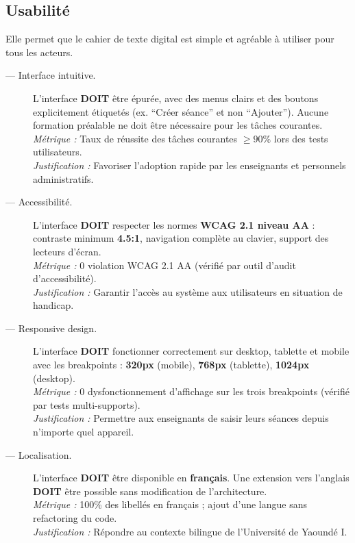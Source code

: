 \subsection{Usabilité}

Elle permet  que le cahier de texte digital est simple et agréable
à utiliser pour tous les acteurs.

\begin{description}

    \item[ — Interface intuitive.]
    L'interface \textbf{DOIT} être épurée, avec des menus clairs et des
    boutons explicitement étiquetés (ex. ``Créer séance'' et non
    ``Ajouter''). Aucune formation préalable ne doit être nécessaire
    pour les tâches courantes.\\
    \textit{Métrique :} Taux de réussite des tâches courantes $\geq 90\%$
    lors des tests utilisateurs.\\
    \textit{Justification :} Favoriser l'adoption rapide par les enseignants
    et personnels administratifs.

    \item[ — Accessibilité.]
    L'interface \textbf{DOIT} respecter les normes \textbf{WCAG 2.1 niveau AA} :
    contraste minimum \textbf{4.5:1}, navigation complète au clavier,
    support des lecteurs d'écran.\\
    \textit{Métrique :} 0 violation WCAG 2.1 AA
    (vérifié par outil d'audit d'accessibilité).\\
    \textit{Justification :} Garantir l'accès au système aux utilisateurs
    en situation de handicap.

    \item[ — Responsive design.]
    L'interface \textbf{DOIT} fonctionner correctement sur desktop, tablette
    et mobile avec les breakpoints : \textbf{320px} (mobile),
    \textbf{768px} (tablette), \textbf{1024px} (desktop).\\
    \textit{Métrique :} 0 dysfonctionnement d'affichage sur les trois
    breakpoints (vérifié par tests multi-supports).\\
    \textit{Justification :} Permettre aux enseignants de saisir leurs
    séances depuis n'importe quel appareil.

    \item[ — Localisation.]
    L'interface \textbf{DOIT} être disponible en \textbf{français}.
    Une extension vers l'anglais \textbf{DOIT} être possible sans
    modification de l'architecture.\\
    \textit{Métrique :} 100\% des libellés en français ; ajout d'une
    langue sans refactoring du code.\\
    \textit{Justification :} Répondre au contexte bilingue de
    l'Université de Yaoundé I.

\end{description}



